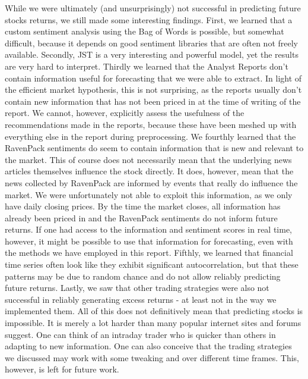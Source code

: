 While we were ultimately (and unsurprisingly) not successful in predicting future stocks returns, we still made some interesting findings. First, we learned that a custom sentiment analysis using the Bag of Words is possible, but somewhat difficult, because it depends on good sentiment libraries that are often not freely available. Secondly, JST is a very interesting and powerful model, yet the results are very hard to interpret. Thirdly we learned that the Analyst Reports don't contain information useful for forecasting that we were able to extract. In light of the efficient market hypothesis, this is not surprising, as the reports usually don't contain new information that has not been priced in at the time of writing of the report. We cannot, however, explicitly assess the usefulness of the  recommendations made in the reports, because these have been meshed up with everything else in the report during preprocessing. We fourthly learned that the RavenPack sentiments do seem to contain information that is new and relevant to the market. This of course does not necessarily mean that the underlying news articles themselves influence the stock directly. It does, however, mean that the news collected by RavenPack are informed by events that really do influence the market. We were unfortunately not able to exploit this information, as we only have daily closing prices. By the time the market closes, all information has already been priced in and the RavenPack sentiments do not inform future returns. If one had access to the information and sentiment scores in real time, however, it might be possible to use that information for forecasting, even with the methods we have employed in this report. Fifthly, we learned that financial time series often look like they exhibit significant autocorrelation, but that these patterns may be due to random chance and do not allow reliably predicting future returns. Lastly, we saw that other trading strategies were also not successful in reliably generating excess returns - at least not in the way we implemented them. All of this does not definitively mean that predicting stocks is impossible. It is merely a lot harder than many popular internet sites and forums suggest. One can think of an intraday trader who is quicker than others in adapting to new information. One can also conceive that the trading strategies we discussed may work with some tweaking and over different time frames. This, however, is left for future work. 







